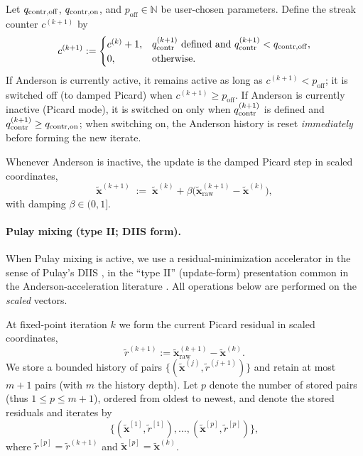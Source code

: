 Let $q_{\mathrm{contr,off}}$, $q_{\mathrm{contr,on}}$, and $p_{\mathrm{off}}\in\mathbb{N}$ be user-chosen parameters. Define the streak counter $c^{(k+1)}$ by
\[
c^{(k+1)} :=
\begin{cases}
c^{(k)}+1, & \rev{q}_{\mathrm{contr}}^{(k+1)}\ \text{defined and}\ \rev{q}_{\mathrm{contr}}^{(k+1)}<\rev{q}_{\mathrm{contr,off}},\\
0, & \text{otherwise}.
\end{cases}
\]
If Anderson is currently active, it remains active as long as $c^{(k+1)}<p_{\mathrm{off}}$; it is switched off (to damped Picard) when $c^{(k+1)}\ge p_{\mathrm{off}}$.
If Anderson is currently inactive (Picard mode), it is switched on only when $q_{\mathrm{contr}}^{(k+1)}$ is defined and $q_{\mathrm{contr}}^{(k+1)}\ge q_{\mathrm{contr,on}}$; when switching on, the Anderson history is reset \emph{immediately} before forming the new iterate.

Whenever Anderson is inactive, the update is the damped Picard step in scaled coordinates,
\begin{equation}\label{eq:picard-damped}
\widetilde{\mathbf{x}}^{(k+1)} \;:=\; \widetilde{\mathbf{x}}^{(k)} + \beta\big(\widetilde{\mathbf{x}}_{\mathrm{raw}}^{(k+1)}-\widetilde{\mathbf{x}}^{(k)}\big),
\end{equation}
with damping $\beta\in(0,1]$.

\paragraph{Pulay mixing (type II; DIIS form).}
When Pulay mixing is active, we use a residual-minimization accelerator in the sense of Pulay's DIIS \cite{Pulay1980_ConvergenceAcceleration}, in the ``type II'' (update-form) presentation common in the Anderson-acceleration literature \cite{Walker2011_AndersonAcceleration}.
All operations below are performed on the \emph{scaled} vectors.

At fixed-point iteration $k$ we form the current Picard residual in scaled coordinates,
\[
\widetilde{r}^{(k+1)} := \widetilde{\mathbf{x}}_{\mathrm{raw}}^{(k+1)}-\widetilde{\mathbf{x}}^{(k)}.
\]
We store a bounded history of pairs $\{(\widetilde{\mathbf{x}}^{(j)},\widetilde{r}^{(j+1)})\}$ and retain at most $m{+}1$ pairs (with $m$ the history depth). Let $p$ denote the number of stored pairs (thus $1\le p\le m{+}1$), ordered from oldest to newest, and denote the stored residuals and iterates by
\[
\{(\widetilde{\mathbf{x}}^{[1]},\widetilde{r}^{[1]}),\dots,(\widetilde{\mathbf{x}}^{[p]},\widetilde{r}^{[p]})\},
\]
where $\widetilde{r}^{[p]}=\widetilde{r}^{(k+1)}$ and $\widetilde{\mathbf{x}}^{[p]}=\widetilde{\mathbf{x}}^{(k)}$.

